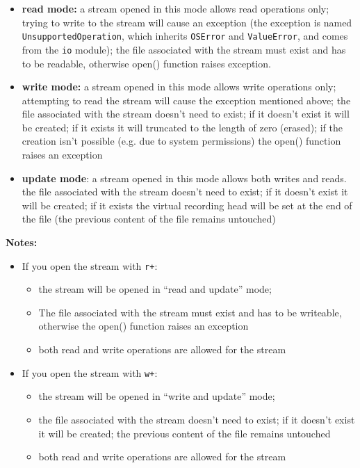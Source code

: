 \documentclass[11pt]{article}
\begin{document}
\begin{itemize}
\item \textbf{read mode:} a stream opened in this mode allows read operations
only; trying to write to the stream will cause an exception (the
exception is named \texttt{UnsupportedOperation}, which inherits \texttt{OSError}
and \texttt{ValueError}, and comes from the \texttt{io} module); the file
associated with the stream must exist and has to be readable,
otherwise open() function raises exception.

\item \textbf{write mode:} a stream opened in this mode allows write operations
only; attempting to read the stream will cause the exception
mentioned above; the file associated with the stream doesn't need to
exist; if it doesn't exist it will be created; if it exists it will
truncated to the length of zero (erased); if the creation isn't
possible (e.g. due to system permissions) the open() function raises
an exception

\item \textbf{update mode}: a stream opened in this mode allows both writes and
reads. the file associated with the stream doesn't need to exist; if
it doesn't exist it will be created; if it exists the virtual
recording head will be set at the end of the file (the previous
content of the file remains untouched)
\end{itemize}

\textbf{Notes:}
\begin{itemize}
\item If you open the stream with \texttt{r+}:
\begin{itemize}
\item the stream will be opened in “read and update” mode;
\item The file associated with the stream must exist and has to be
writeable, otherwise the open() function raises an exception
\item both read and write operations are allowed for the stream
\end{itemize}
\end{itemize}


\begin{itemize}
\item If you open the stream with \texttt{w+}:
\begin{itemize}
\item the stream will be opened in “write and update” mode;
\item the file associated with the stream doesn't need to exist; if it
doesn't exist it will be created; the previous content of the file
remains untouched
\item both read and write operations are allowed for the stream
\end{itemize}
\end{itemize}
\end{document}

